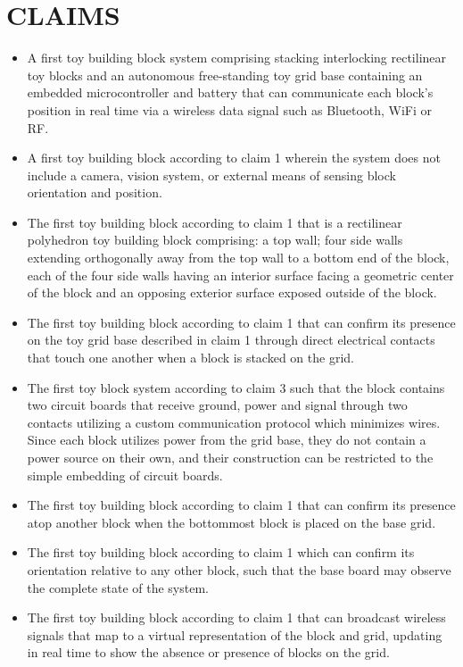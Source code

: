 \documentclass[]{article}
\begin{document}
\section{CLAIMS}
\begin{itemize}
\item A first toy building block system comprising stacking interlocking rectilinear toy blocks and an autonomous free-standing toy grid base containing an embedded microcontroller and battery that can communicate each block’s position in real time via a wireless data signal such as Bluetooth, WiFi or RF.

\item A first toy building block according to claim 1 wherein the system does not include a camera, vision system, or external means of sensing block orientation and position. 

\item The first toy building block according to claim 1 that is a rectilinear polyhedron toy building block comprising: a top wall; four side walls extending orthogonally away from the top wall to a bottom end of the block, each of the four side walls having an interior surface facing a geometric center of the block and an opposing exterior surface exposed outside of the block.

\item The first toy building block according to claim 1 that can confirm its presence on the toy grid base described in claim 1 through direct electrical contacts that touch one another when a block is stacked on the grid. 

\item The first toy block system according to claim 3 such that the block contains two circuit boards that receive ground, power and signal through two contacts utilizing a custom communication protocol which minimizes wires. Since each block utilizes power from the grid base, they do not contain a power source on their own, and their construction can be restricted to the simple embedding of circuit boards.

\item The first toy building block according to claim 1 that can confirm its presence atop another block when the bottommost block is placed on the base grid.

\item The first toy building block according to claim 1 which can confirm its orientation relative to any other block, such that the base board may observe the complete state of the system. 

\item The first toy building block according to claim 1 that can broadcast wireless signals that map to a virtual representation of the block and grid, updating in real time to show the absence or presence of blocks on the grid.
\end{itemize}
\end{document}
